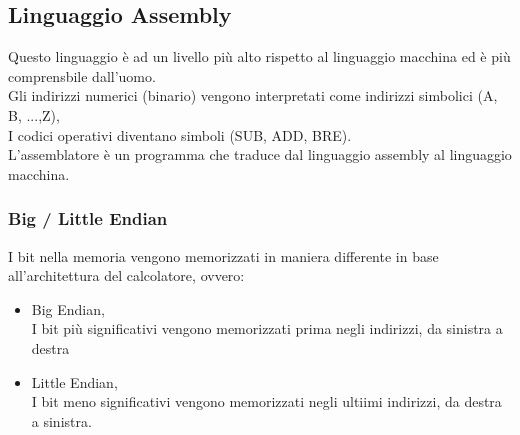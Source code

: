 \documentclass[12pt, a4paper]{report}
\begin{document}
\subsection{Linguaggio Assembly}%
\label{sub:linguaggio_assembly}
Questo linguaggio è ad un livello più alto rispetto al linguaggio macchina ed è più comprensbile dall'uomo.\\
Gli indirizzi numerici (binario) vengono interpretati come indirizzi simbolici (A, B, ...,Z),\\
I codici operativi diventano simboli (SUB, ADD, BRE).\\
L'assemblatore è un programma che traduce dal linguaggio assembly al linguaggio macchina.\\

\subsubsection{Big / Little Endian}
I bit nella memoria vengono memorizzati in maniera differente in base all'architettura del calcolatore, ovvero:

\begin{itemize}
	\item Big Endian,\\
		I bit più significativi vengono memorizzati prima negli indirizzi, da sinistra a destra
	\item Little Endian,\\
		I bit meno significativi vengono memorizzati negli ultiimi indirizzi, da destra a sinistra.	
\end{itemize}
\end{document}
